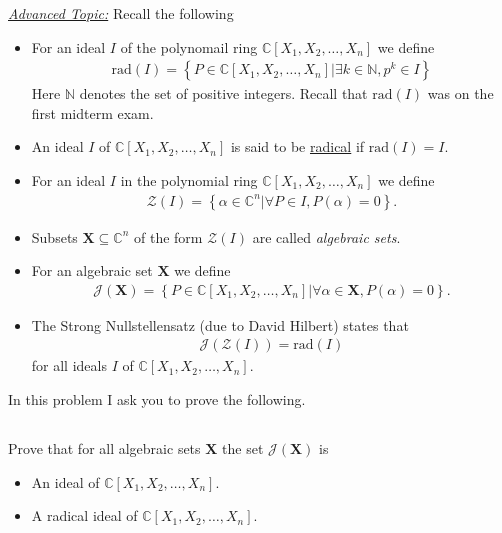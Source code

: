 \documentclass[10pt]{amsart}
\newcommand{\N}{\mathbb{N}}
\newcommand{\C}{\mathbb{C}}
\newcommand{\rad}[1]{\text{rad}\left(#1\right)}
\begin{document}
\underline{\textit{Advanced Topic:}} Recall the following
\begin{itemize}
  \item For an ideal $I$ of the polynomail ring $\C[X_1,X_2,\ldots,X_n]$ we
    define
    \begin{align*}
      \rad{I}=\left\{P\in\C[X_1,X_2,\ldots,X_n]|\exists k\in\N,p^k\in I\right\}
    \end{align*}
    Here $\N$ denotes the set of positive integers. Recall that $\rad{I}$ was
    on the first midterm exam.

  \item An ideal $I$ of $\C[X_1,X_2,\ldots,X_n]$ is said to be
    \underline{radical} if $\rad{I}=I$.

  \item For an ideal $I$ in the polynomial ring $\C[X_1,X_2,\ldots,X_n]$ we
    define
    \begin{align*}
      \mathscr{Z}(I)=\left\{\alpha\in\C^n\vert\forall P\in
        I,P(\alpha)=0\right\}.
    \end{align*}

  \item Subsets $\mathbf{X}\subseteq \C^n$ of the form $\mathscr{Z}(I)$ are called
    \textit{algebraic sets}.

  \item For an algebraic set $\mathbf{X}$ we define
    \begin{align*}
      \mathscr{J}(\mathbf{X})=\left\{P\in\C[X_1,X_2,\ldots,X_n]\vert\forall
        \alpha\in\mathbf{X},P(\alpha)=0\right\}.
    \end{align*}

  \item The Strong Nullstellensatz (due to David Hilbert) states that
    \begin{align*}
      \mathscr{J}(\mathscr{Z}(I))=\rad{I}
    \end{align*}
    for all ideals $I$ of $\C[X_1,X_2,\ldots,X_n]$.
\end{itemize}
In this problem I ask you to prove the following.

\subsection{}%
\label{sub:4a}

Prove that for all algebraic sets $\mathbf{X}$ the set
$\mathscr{J}(\mathbf{X})$ is
\begin{itemize}
  \item An ideal of $\C[X_1,X_2,\ldots,X_n]$.
  \item A radical ideal of $\C[X_1,X_2,\ldots,X_n]$.
\end{itemize}
\end{document}
